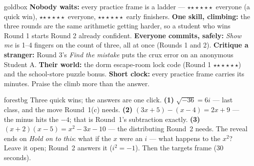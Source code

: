\documentclass[10pt]{article}
\newcommand{\rung}[1]{{\color{goldacc}\ifcase#1\or$\star$\or$\star\star$\or$\star\star\star$\fi}}
\begin{document}
\begin{skillbox}{goldbox}
\textbf{Nobody waits:} every practice frame is a ladder --- \rung1\ everyone (a quick win),
\rung2\ everyone, \rung3\ early finishers. \textbf{One skill, climbing:} the three rounds are the
same arithmetic getting harder, so a student who wins Round 1 starts Round 2 already confident.
\textbf{Everyone commits, safely:} \emph{Show me} is 1--4 fingers on the count of three, all at
once (Rounds 1 and 2). \textbf{Critique a stranger:} Round 3's \emph{Find the mistake} puts the
crux error on an anonymous Student A. \textbf{Their world:} the dorm escape-room lock code
(Round 1 \rung3) and the school-store puzzle bonus. \textbf{Short clock:} every practice frame
carries its minutes. Praise the climb more than the answer.
\end{skillbox}

\begin{skillbox}{forestbg}
Three quick wins; the answers are one click. \textbf{(1)} $\sqrt{-36}=6i$ --- last class, and the
move Round~1(c) needs. \textbf{(2)} $(3x+5)-(x-4)=2x+9$ --- the minus hits the $-4$; that is
Round~1's subtraction exactly. \textbf{(3)} $(x+2)(x-5)=x^2-3x-10$ --- the distributing Round~2
needs. The reveal ends on \emph{Hold on to this}: what if the $x$ were an $i$ --- what happens to
the $x^2$? Leave it open; Round~2 answers it ($i^2=-1$). Then the targets frame (30 seconds).
\end{skillbox}
\end{document}
